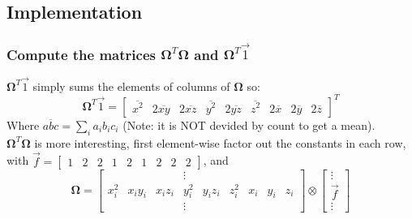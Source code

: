 \documentclass{article}
\def\mat#1{\mathbf{#1}}
\begin{document}
\subsection{Implementation}
\subsubsection{ Compute the matrices $\mat{\Omega}^T \mat{\Omega}$ and $\mat{\Omega}^T \vec{1}$ }
$\mat{\Omega}^T \vec{1}$ simply sums the elements of columns of $\mat{\Omega}$ so:
\begin{equation}
\mat{\Omega}^T \vec{1} =  \left[ \begin{matrix}
\overline { x^2 } &
2\overline { x y } &
2\overline { x z } &
\overline { y^2 } &
2\overline { y z } &
\overline { z^2 } &
2\overline { x } &
2\overline { y } &
2\overline { z }
\end{matrix}\right]^T
\end{equation}
Where $\overline{abc} = \sum_i a_i b_i c_i$ (Note: it is NOT devided by count to get a mean).
\\
$\mat{\Omega}^T\mat{\Omega}$ is more interesting, first element-wise factor out the constants in 
each row,\\ with
$\vec{f} = 
\left[ \begin{matrix}
1 & 2 & 2 & 1 & 2 & 1 & 2 & 2 & 2
\end{matrix}\right]$, and
\begin{equation}
\mat{\Omega} = \left[ \begin{matrix}
& & & \vdots \\
x_i^2 & x_iy_i & x_iz_i & y_i^2 & y_iz_i & z_i^2 & x_i & y_i & z_i \\
& & & \vdots  
\end{matrix}\right] \otimes \left[\begin{matrix} \vdots\\ \vec{f} \\ \vdots \end{matrix}\right]
\end{equation}
\end{document}
